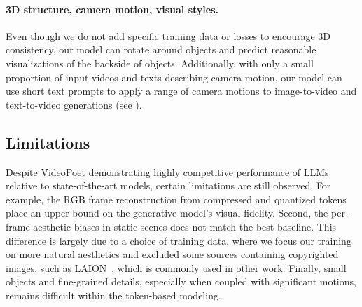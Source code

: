 \paragraph{3D structure, camera motion, visual styles.}
Even though we do not add specific training data or losses to encourage 3D consistency, our model
can rotate around objects and predict reasonable visualizations of the backside of objects. Additionally, with only a small proportion of input videos and texts describing camera motion, our model can use short text prompts to apply a range of camera motions to image-to-video and text-to-video generations (see ).

\subsection{Limitations}

Despite VideoPoet demonstrating highly competitive performance of LLMs relative to state-of-the-art models, certain limitations are still observed.
For example, the RGB frame reconstruction from compressed and quantized tokens place an upper bound on the generative model's visual fidelity. Second, the per-frame aesthetic biases in static scenes does not match the best baseline.
This difference is largely due to a choice of training data, where we focus our training on more natural aesthetics %
and excluded some sources containing copyrighted images, such as LAION~\cite{schuhmann2022laion}, which is commonly used in other work.
Finally, small objects and fine-grained details, especially when coupled with significant motions, remains difficult within the token-based modeling.



